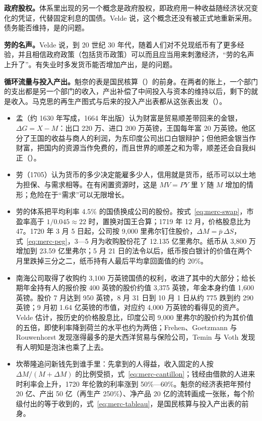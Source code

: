\textbf{政府股权。}体系里出现的另一个概念是政府股权，即政府用一种收益随经济状况变化的凭证，代替固定利息的国债。Velde 说，这个概念还没有被正式地重新采用\cite{velde2003}。债务能否维持，是的问题。

\textbf{劳的名声。}Velde 说，到 20 世纪 30 年代，随着人们对不兑现纸币有了更多经验，并且相信政府政策（包括货币政策）可以而且应当用来刺激经济，“劳的名声上升了”\cite{velde2003}。有失业时多发货币能否增加产出，是的问题。

\textbf{循环流量与投入产出。}魁奈的表是国民核算（）的前身。在两者的账上，一个部门的支出都是另一个部门的收入，产出补偿了中间投入与资本的维持以后，剩下的就是收入。马克思的再生产图式与后来的投入产出表都从这张表出发（）。

\begin{takeaways}
\begin{itemize}
\item 孟（约 1630 年写成，1664 年出版）认为财富是贸易顺差带回来的金银，$\Delta G=X-M$：出口 220 万、进口 200 万英镑，王国每年富 20 万英镑。他区分了王国的收益与商人的利润，为东印度公司出口白银辩护；但他把金银当作财富，把国内的资源当作免费的，而且世界的顺差之和为零，顺差还会自我纠正（）。
\item 劳（1705）认为货币的多少决定能雇多少人，信用就是货币，纸币可以以土地为担保、与需求相等。在有闲置资源时，这是 $MV=PY$ 里 $Y$ 随 $M$ 增加的情形；危险在于“需求”可以无限增长。
\item 劳的体系把平均利率 4.5\% 的国债换成公司的股份。按式~\eqref{eq:merc-swap}，市盈率高于 $1/0.045\approx22$ 时，置换对国王合算；1719 年 12 月，价格股息比为 47。1720 年 3 月 5 日起，公司按 9,000 里弗尔钉住股价，$\Delta M=\bar p\,\Delta S$，式~\eqref{eq:merc-peg}，3—5 月为收购股份花了 12.135 亿里弗尔。纸币从 3,800 万增加到 23.59 亿里弗尔；5 月 21 日的法令以后，纸币按白银计的价值在两个月里跌掉三分之二，纸币持有人最后平均拿回面值的约 20\%。
\item 南海公司取得了收购约 3,100 万英镑国债的权利，收进了其中的大部分；给长期年金持有人的报价按 400 英镑的股价约值 3,375 英镑，年金本身约值 1,600 英镑。股价 7 月达到 950 英镑，8 月 31 日到 10 月 1 日从约 775 跌到约 290 英镑；9 月初 1.64 亿英镑的市值，对应约 4,000 万英镑的看得见的资产。Velde 估计，按历史的价格股息比，印度公司 9,000 里弗尔的股价约为其价值的五倍，即使利率降到荷兰的水平也约为两倍；Frehen、Goetzmann 与 Rouwenhorst 发现涨得最多的是大西洋贸易与保险公司，Temin 与 Voth 发现有人明知是泡沫也乘了上去。
\item 坎蒂隆追问新钱先到谁手里：先拿到的人得益，收入固定的人按 $\Delta M/(M+\Delta M)$ 的比例受损，式~\eqref{eq:merc-cantillon}；钱经由借款的人进来时利率会上升，1720 年伦敦的利率涨到 50\%—60\%。魁奈的经济表把年预付 20 亿、产出 50 亿（再生产 250\%）、净产品 20 亿的流转画成一张账，每个阶级付出的等于收到的，式~\eqref{eq:merc-tableau}，是国民核算与投入产出表的前身。
\end{itemize}
\end{takeaways}

